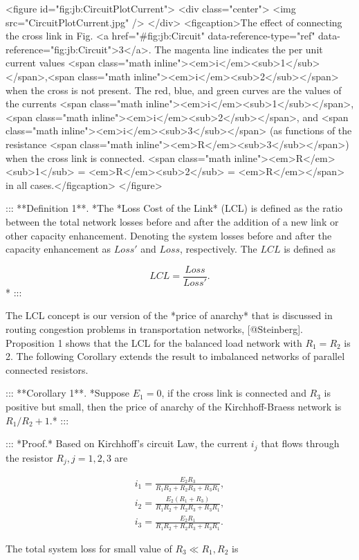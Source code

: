 <figure id="fig:jb:CircuitPlotCurrent"> <div class="center"> <img src="CircuitPlotCurrent.jpg" /> </div> <figcaption>The effect of connecting the cross link in Fig. <a href="#fig:jb:Circuit" data-reference-type="ref" data-reference="fig:jb:Circuit">3</a>. The magenta line indicates the per unit current values <span class="math inline"><em>i</em><sub>1</sub></span>,<span class="math inline"><em>i</em><sub>2</sub></span> when the cross is not present. The red, blue, and green curves are the values of the currents <span class="math inline"><em>i</em><sub>1</sub></span>,<span class="math inline"><em>i</em><sub>2</sub></span>, and <span class="math inline"><em>i</em><sub>3</sub></span> (as functions of the resistance <span class="math inline"><em>R</em><sub>3</sub></span>) when the cross link is connected. <span class="math inline"><em>R</em><sub>1</sub> = <em>R</em><sub>2</sub> = <em>R</em></span> in all cases.</figcaption> </figure>

::: **Definition 1**. *The *Loss Cost of the Link* (LCL) is defined as the ratio between the total network losses before and after the addition of a new link or other capacity enhancement. Denoting the system losses before and after the capacity enhancement as $Loss'$ and $Loss$, respectively. The $LCL$ is defined as

$$LCL= \frac{Loss}{Loss'}.$$* :::

The LCL concept is our version of the *price of anarchy* that is discussed in routing congestion problems in transportation networks, [@Steinberg]. Proposition 1 shows that the LCL for the balanced load network with $R_1=R_2$ is 2. The following Corollary extends the result to imbalanced networks of parallel connected resistors.

::: **Corollary 1**. *Suppose $E_1=0$, if the cross link is connected and $R_3$ is positive but small, then the price of anarchy of the Kirchhoff-Braess network is $R_1/R_2 + 1.$* :::

::: *Proof.* Based on Kirchhoff's circuit Law, the current $i_j$ that flows through the resistor $R_j,j=1,2,3$ are

$$\begin{aligned} i_1 = \frac{E_2 R_3}{R_1R_2+R_2R_3+R_3R_1},\nonumber\\ i_2 = \frac{E_2 (R_1+R_3)}{R_1R_2+R_2R_3+R_3R_1},\nonumber\\ i_3 = \frac{E_2 R_1}{R_1R_2+R_2R_3+R_3R_1}.\nonumber \end{aligned}$$

The total system loss for small value of $R_3 \ll R_1,R_2$ is

